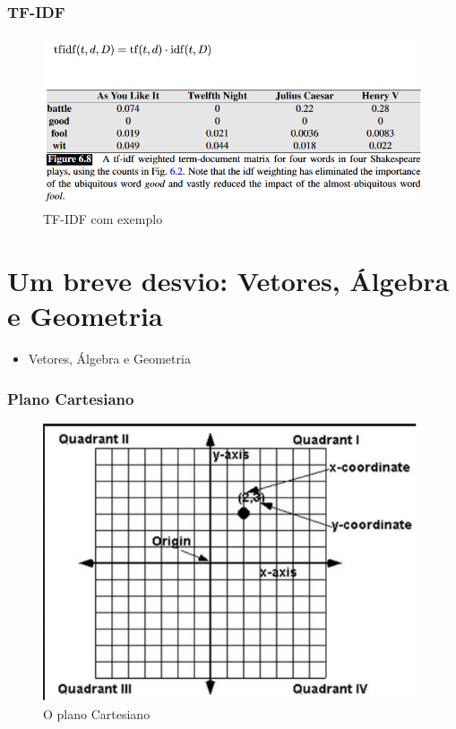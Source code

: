 \documentclass{beamer}
\begin{document}

\begin{frame}
\frametitle{TF-IDF}
\begin{figure}
	\centering
	\includegraphics[width=0.7\linewidth]{tf-idf(short)}
	\caption{TF-IDF com exemplo}
	\label{fig:tf-idfshort}
\end{figure}

\end{frame}



\section{Um breve desvio: Vetores, Álgebra e Geometria}

\begin{frame}
\begin{itemize}
    \item \Large{Vetores, Álgebra e Geometria}

\end{itemize}

\end{frame}

\begin{frame}
\frametitle{Plano Cartesiano}

\begin{figure}
	\centering
	\includegraphics[width=0.7\linewidth]{descartes1}
	\caption[]{O plano Cartesiano}
	\label{fig:descartes1}
\end{figure}
\end{frame}
\end{document}
